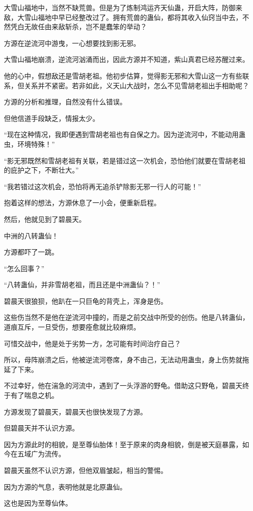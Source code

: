 \begin{this_body}
大雪山福地中，当然不缺荒兽。但是为了炼制鸿运齐天仙蛊，开启大阵，防御来敌，大雪山福地中早已经整改过了。拥有荒兽的蛊仙，都将其收入仙窍当中去，不然凭白无故任由来敌斩杀，岂不是蠢笨的举动？

方源在逆流河中游曳，一心想要找到影无邪。

大雪山福地崩溃，逆流河汹涌而出，因此方源并不知道，紫山真君已经苏醒过来。

他的心中，假想敌还是雪胡老祖。他初步估算，觉得影无邪和大雪山这一方有些联系，但关系并不紧密。若非如此，义天山大战时，怎么不见雪胡老祖出手相助呢？

方源的分析和推理，自然没有什么错误。

但他信道手段缺乏，情报太少。

“现在这种情况，我即便遇到雪胡老祖也有自保之力。因为逆流河中，不能动用蛊虫，环境特殊！”

“影无邪既然和雪胡老祖有关联，若是错过这一次机会，恐怕他们就要在雪胡老祖的庇护之下，不断壮大。”

“我若错过这次机会，恐怕将再无追杀铲除影无邪一行人的可能！”

抱着这样的想法，方源休息了一小会，便重新启程。

然后，他就见到了碧晨天。

中洲的八转蛊仙！

方源都吓了一跳。

“怎么回事？”

“八转蛊仙，并非雪胡老祖，而且还是中洲蛊仙？！”

碧晨天很狼狈，他趴在一只巨龟的背壳上，浑身是伤。

这些伤当然不是他在逆流河中撞的，而是之前交战中所受的创伤。他是八转蛊仙，道痕互斥，一旦受伤，想要痊愈就比较麻烦。

可惜交战中，他是处于劣势一方，怎可能有时间治疗自己？

所以，母阵崩溃之后，他被逆流河卷席，身不由己，无法动用蛊虫，身上伤势就拖延了下来。

不过幸好，他在湍急的河流中，遇到了一头浮游的野龟。借助这只野龟，碧晨天终于有了喘息之机。

方源发现了碧晨天，碧晨天也很快发现了方源。

但碧晨天并不认识方源。

因为方源此时的相貌，是至尊仙胎体！至于原来的肉身相貌，倒是被天庭暴露，如今在五域广为流传。

碧晨天虽然不认识方源，但他双眉皱起，相当的警惕。

因为方源的气息，表明他就是北原蛊仙。

这也是因为至尊仙体。


\end{this_body}
